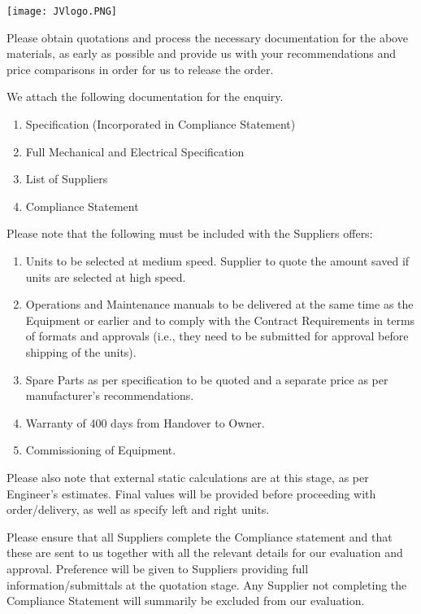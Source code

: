 \documentclass[a4paper,11pt,oneside]{article}
\def\signature{%
 \YL\encl}
\begin{document}
\sffamily
\mbox{}
\texttt{[image: JVlogo.PNG]}
\vspace{1em}

\Date 


\TOMCD


\setlength{\parskip}{\baselineskip}


Please obtain quotations and process the necessary documentation for the above materials, as early as possible and provide us with your recommendations and price comparisons in order for us to release the order. 

We attach the following documentation for the enquiry. 

\begin{enumerate}

\item Specification (Incorporated in Compliance Statement)
\item Full Mechanical and Electrical Specification
\item List of Suppliers
\item Compliance Statement
\end{enumerate}

Please note that the following must be included with the Suppliers offers:

\begin{enumerate}
\item Units to be selected at medium speed. Supplier to quote the amount saved if units are selected at high speed.
\item  Operations and Maintenance manuals to be delivered at the same time as the Equipment or earlier and to comply with the Contract Requirements in terms of formats and approvals (i.e., they need to be submitted for approval before shipping of the units).
\item Spare Parts as per specification to be quoted and a separate price as per manufacturer's recommendations.
\item Warranty of 400 days from Handover to Owner.
\item Commissioning of Equipment.
\end{enumerate}

Please also note that external static calculations are at this stage, as per Engineer's estimates. Final values will be provided before proceeding with order/delivery, as well as specify left and right units.


Please ensure that all Suppliers complete the Compliance statement and that these are sent to us together with all the relevant details for our evaluation and approval. Preference will be given to Suppliers providing full information/submittals at the quotation stage. Any Supplier not completing the Compliance Statement will summarily be excluded from our evaluation.



\signature
\end{document}
